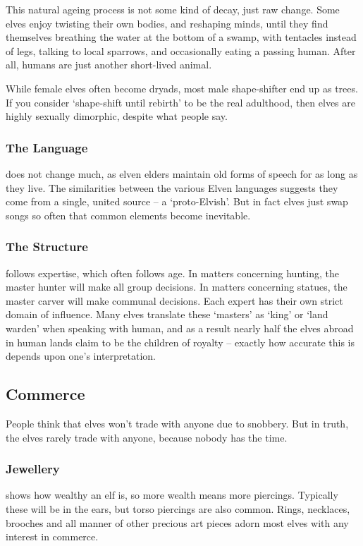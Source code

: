 \begin{multicols}{2}
This natural ageing process is not some kind of decay, just raw change.
Some elves enjoy twisting their own bodies, and reshaping minds, until they find themselves breathing the water at the bottom of a swamp, with tentacles instead of legs, talking to local sparrows, and occasionally eating a passing human.
After all, humans are just another short-lived animal.

While female elves often become \glspl{dryad}, most male shape-shifter end up as trees.
If you consider `shape-shift until rebirth' to be the real adulthood, then elves are highly sexually dimorphic, despite what people say.

\subsubsection{The Language}
does not change much, as elven elders maintain old forms of speech for as long as they live.
The similarities between the various Elven languages suggests they come from a single, united source -- a `proto-Elvish'.
But in fact elves just swap songs so often that common elements become inevitable.

\subsubsection{The Structure}
follows expertise, which often follows age.
In matters concerning hunting, the master hunter will make all group decisions.
In matters concerning statues, the master carver will make communal decisions.
Each expert has their own strict domain of influence.
Many elves translate these `masters' as `king' or `land warden' when speaking with human, and as a result nearly half the elves abroad in human lands claim to be the children of royalty -- exactly how accurate this is depends upon one's interpretation.

\subsection{Commerce}

People think that elves won't trade with anyone due to snobbery.
But in truth, the elves rarely trade with anyone, because nobody has the time.

\subsubsection{Jewellery}
shows how wealthy an elf is, so more wealth means more piercings.
Typically these will be in the ears, but torso piercings are also common.
Rings, necklaces, brooches and all manner of other precious art pieces adorn most elves with any interest in commerce.


\end{multicols}
